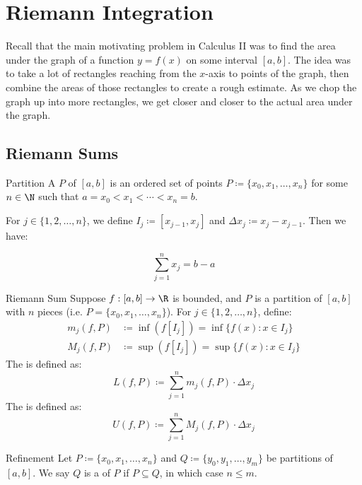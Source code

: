 \chapter{Riemann Integration}

Recall that the main motivating problem in Calculus II was to find the area under the graph of a function $y = f(x)$ on some interval $[a,b]$. The idea was to take a lot of rectangles reaching from the $x$-axis to points of the graph, then combine the areas of those rectangles to create a rough estimate. As we chop the graph up into more rectangles, we get closer and closer to the actual area under the graph.

\section{Riemann Sums}

\begin{dfnbox}{Partition}{}
    A  $P$ of $[a,b]$ is an ordered set of points $P \coloneq \{ x_0, x_1, \ldots, x_n \}$ for some $n \in \N$ such that $a = x_0 < x_1 < \cdots < x_n = b$.
\end{dfnbox}


For $j \in \{1, 2, \ldots, n\}$, we define $I_j \coloneq [x_{j-1}, x_j]$ and $\Delta x_j \coloneq x_j - x_{j-1}$. Then we have:

\[ \sum_{j=1}^{n} x_j = b - a \]



\begin{dfnbox}{Riemann Sum}{}
    Suppose $f : [a,b] \to \R$ is bounded, and $P$ is a partition of $[a,b]$ with $n$ pieces (i.e. $P = \{x_0, x_1, \ldots, x_n\}$). For $j \in \{1, 2, \ldots, n\}$, define:
    \begin{align*}
        m_j(f, P) &\coloneq \inf \left( f[I_j] \right) = \inf\{ f(x) : x \in I_j \} \\
        M_j(f, P) &\coloneq \sup \left( f[I_j] \right) = \sup\{ f(x) : x \in I_j \}
    \end{align*}
    The  is defined as:
    \[ L(f, P) \coloneq \sum_{j=1}^{n} m_j(f,P) \cdot \Delta x_j \]
    The  is defined as:
    \[ U(f, P) \coloneq \sum_{j=1}^{n} M_j(f,P) \cdot \Delta x_j \]
\end{dfnbox}

\begin{dfnbox}{Refinement}{}
    Let $P \coloneq \{ x_0, x_1, \ldots, x_n\}$ and $Q \coloneq \{y_0, y_1, \ldots, y_m \}$ be partitions of $[a,b]$. We say $Q$ is a  of $P$ if $P \subseteq Q$, in which case $n \leq m$.
\end{dfnbox}

